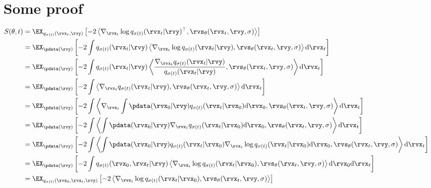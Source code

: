 \chapter{Some proof} \label{sec:proof-that-diffusion-does-score-matching}

\begin{align}
\allowdisplaybreaks
S(\theta, t) &= \EX_{q_{\sigma(t)}(\rvx_t, \rvy)} \left[ - 2 \left\langle \nabla_{\rvx_t} \log q_{\sigma(t)}(\rvx_t|\rvy)^\top, \rvs_\theta(\rvx_t, \rvy, \sigma) \right\rangle \right] \\
    &= \EX_{\pdata(\rvy)}\left[  - 2 \int q_{\sigma(t)}(\rvx_t | \rvy) \left\langle \nabla_{\rvx_t} \log q_{\sigma(t)}(\rvx_t | \rvy), \rvs_\theta(\rvx_t, \rvy, \sigma) \right\rangle \mathrm{d} \rvx_t \right] \\
    &= \EX_{\pdata(\rvy)}\left[ - 2 \int q_{\sigma(t)}(\rvx_t | \rvy) \left\langle \frac{\nabla_{\rvx_t} q_{\sigma(t)}(\rvx_t|\rvy)}{q_{\sigma(t)}(\rvx_t | \rvy)}, \rvs_\theta(\rvx_t, \rvy, \sigma) \right\rangle \mathrm{d} \rvx_t \right] \\
    &= \EX_{\pdata(\rvy)}\left[  - 2 \int \left\langle \nabla_{\rvx_t} q_{\sigma(t)}(\rvx_t | \rvy), \rvs_\theta(\rvx_t, \rvy, \sigma) \right\rangle \mathrm{d} \rvx_t \right] \\
    &= \EX_{\pdata(\rvy)}\left[  - 2 \int \left\langle \nabla_{\rvx_t} \int \pdata(\rvx_0|\rvy) q_{\sigma(t)}(\rvx_t|\rvx_0) \mathrm{d}\rvx_0, \rvs_\theta(\rvx_t, \rvy, \sigma) \right\rangle \mathrm{d} \rvx_t \right] \\
    &= \EX_{\pdata(\rvy)}\left[  - 2 \int \left\langle \int \pdata(\rvx_0|\rvy) \nabla_{\rvx_t} q_{\sigma(t)}(\rvx_t|\rvx_0) \mathrm{d}\rvx_0, \rvs_\theta(\rvx_t, \rvy, \sigma) \right\rangle \mathrm{d} \rvx_t \right] \\
    &= \EX_{\pdata(\rvy)}\left[  - 2 \int \left\langle \int \pdata(\rvx_0|\rvy) q_{\sigma(t)}(\rvx_t|\rvx_0) \nabla_{\rvx_t} \log q_{\sigma(t)}(\rvx_t|\rvx_0) \mathrm{d}\rvx_0, \rvs_\theta(\rvx_t, \rvy, \sigma) \right\rangle \mathrm{d} \rvx_t \right] \\
    &= \EX_{\pdata(\rvy)}\left[  - 2 \int q_{\sigma(t)}(\rvx_0, \rvx_t|\rvy) \left\langle \nabla_{\rvx_t} \log q_{\sigma(t)}(\rvx_t|\rvx_0), \rvs_\theta(\rvx_t, \rvy, \sigma) \right\rangle  \mathrm{d}\rvx_0 \mathrm{d} \rvx_t \right] \\
    &= \EX_{q_{\sigma(t)}(\rvx_0, \rvx_t, \rvy)} \left[ -2 \left\langle \nabla_{\rvx_t} \log q_{\sigma(t)}(\rvx_t|\rvx_0), \rvs_\theta(\rvx_t, \rvy, \sigma) \right\rangle  \right]
\end{align}


